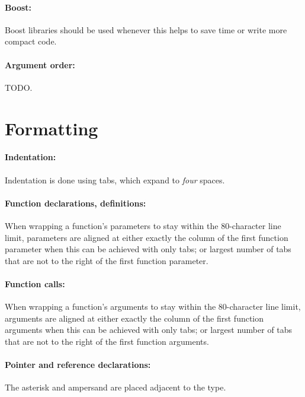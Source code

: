 \documentclass[footinclude=false,11pt,DIV11]{scrartcl}
\begin{document}
\paragraph{Boost:} Boost libraries should be used whenever this helps to save time or
write more compact code.

\paragraph{Argument order:} TODO.


\section{Formatting}

\paragraph{Indentation:} Indentation is done using tabs, which expand to \emph{four}
spaces.

\paragraph{Function declarations, definitions:} When wrapping a function's parameters
to stay within the 80-character line limit, parameters are aligned at either exactly
the column of the first function parameter when this can be achieved with only tabs; or
largest number of tabs that are not to the right of the first function parameter.

\paragraph{Function calls:} When wrapping a function's arguments to stay within the
80-character line limit, arguments are aligned at either exactly the column of the
first function arguments when this can be achieved with only tabs; or largest number of
tabs that are not to the right of the first function arguments.

\paragraph{Pointer and reference declarations:} The asterisk and ampersand are placed
adjacent to the type.
\end{document}
